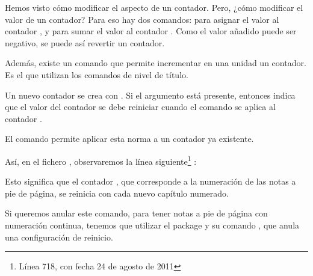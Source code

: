 Hemos visto cómo modificar el aspecto de un contador. Pero, ¿cómo modificar el valor de un contador? Para eso hay dos comandos:  para asignar el valor  al contador , y  para sumar el valor  al contador . Como el valor añadido puede ser negativo, se puede así revertir un contador.

Además, existe un comando  que permite incrementar en una unidad un contador. Es el que utilizan los comandos de nivel de título.



Un nuevo contador se crea con
 . 
Si el argumento  está presente, entonces indica que el valor del contador  se debe reiniciar cuando el comando  se aplica al contador .

El comando    permite aplicar esta norma a un contador ya existente.

Así, en el fichero , observaremos la línea siguiente\footnote{Línea 718, con fecha 24 de agosto de 2011} :

\begin{latexcode}
\end{latexcode} 

Esto significa que el contador  , que corresponde a la numeración de las notas a pie de página, se reinicia con cada nuevo capítulo numerado. 

Si queremos anular este comando, para tener notas a pie de página con numeración continua, tenemos que utilizar el package  y su comando , que anula una configuración de reinicio.

\begin{latexcode}
\usepackage{remreset}
\makeatletter
{}
\makeatother
\end{latexcode}
